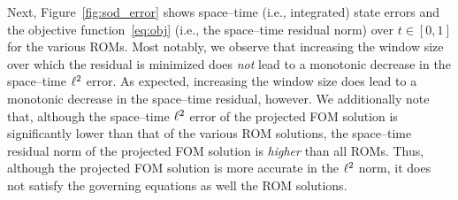 Next, Figure~\ref{fig:sod_error} shows space--time (i.e., integrated) state errors and the objective function~\eqref{eq:obj} (i.e., the space--time residual norm) over $t \in [0,1]$ for the various ROMs. Most notably, we observe 
that increasing the window size over which the residual is minimized does \textit{not} lead to a monotonic decrease in the space--time $\ell^2$  
error. As expected, increasing the window size does lead to a monotonic decrease in the space--time residual, however. We additionally note that, although the space--time
$\ell^2$ error of 
the projected FOM solution is significantly lower than that of the various ROM solutions, the space--time residual norm of the projected FOM solution is \textit{higher} 
than all ROMs. Thus, although the projected FOM solution is more accurate in the $\ell^2$ norm, it does not satisfy the governing equations as well the ROM solutions. 

